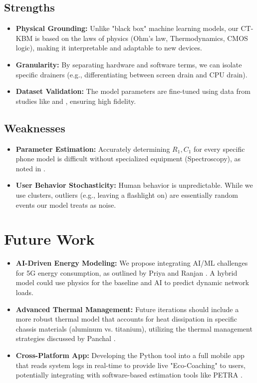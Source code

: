 \documentclass[12pt]{article}
\begin{document}
\subsection{Strengths}
\begin{itemize}
    \item \textbf{Physical Grounding:} Unlike "black box" machine learning models, our CT-KBM is based on the laws of physics (Ohm's law, Thermodynamics, CMOS logic), making it interpretable and adaptable to new devices.
    \item \textbf{Granularity:} By separating hardware and software terms, we can isolate specific drainers (e.g., differentiating between screen drain and CPU drain).
    \item \textbf{Dataset Validation:} The model parameters are fine-tuned using data from studies like \cite{12} and \cite{8}, ensuring high fidelity.
\end{itemize}

\subsection{Weaknesses}
\begin{itemize}
    \item \textbf{Parameter Estimation:} Accurately determining $R_1, C_1$ for every specific phone model is difficult without specialized equipment (Spectroscopy), as noted in \cite{7}.
    \item \textbf{User Behavior Stochasticity:} Human behavior is unpredictable. While we use clusters, outliers (e.g., leaving a flashlight on) are essentially random events our model treats as noise.
\end{itemize}

\newpage

\section{Future Work}

\begin{itemize}
    \item \textbf{AI-Driven Energy Modeling:} We propose integrating AI/ML challenges for 5G energy consumption, as outlined by Priya and Ranjan \cite{4}. A hybrid model could use physics for the baseline and AI to predict dynamic network loads.
    
    \item \textbf{Advanced Thermal Management:} Future iterations should include a more robust thermal model that accounts for heat dissipation in specific chassis materials (aluminum vs. titanium), utilizing the thermal management strategies discussed by Panchal \cite{14}.
    
    \item \textbf{Cross-Platform App:} Developing the Python tool into a full mobile app that reads system logs in real-time to provide live "Eco-Coaching" to users, potentially integrating with software-based estimation tools like PETRA \cite{15}.
\end{itemize}
\end{document}
